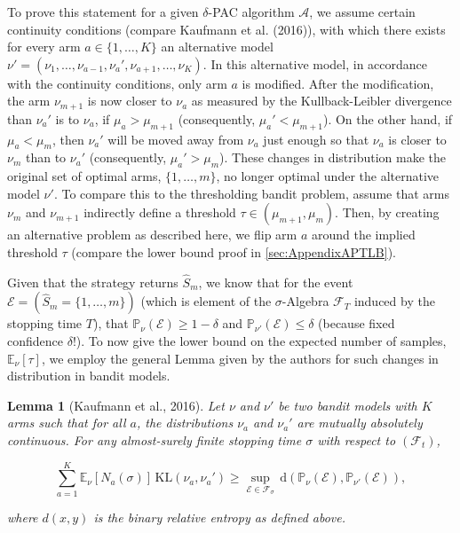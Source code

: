 \documentclass[11pt,]{article}
\newtheorem{lemma}{Lemma}
\newcommand{\KL}{\,\text{KL}}
\newcommand{\der}{\,\text{d}}
\begin{document}
To prove this statement for a given \(\delta\)-PAC algorithm
\(\mathcal{A}\), we assume certain continuity conditions (compare
Kaufmann et al. (2016)), with which there exists for every arm
\(a \in \{1, \dots, K\}\) an alternative model
\(\nu' = (\nu_1, \dots, \nu_{a-1}, \nu_a', \nu_{a+1}, \dots, \nu_K)\).
In this alternative model, in accordance with the continuity conditions,
only arm \(a\) is modified. After the modification, the arm
\(\nu_{m+1}\) is now closer to \(\nu_a\) as measured by the
Kullback-Leibler divergence than \(\nu_a'\) is to \(\nu_a\), if
\(\mu_a > \mu_{m+1}\) (consequently, \(\mu_a' < \mu_{m+1}\)). On the
other hand, if \(\mu_a < \mu_{m}\), then \(\nu_a'\) will be moved away
from \(\nu_a\) just enough so that \(\nu_a\) is closer to \(\nu_m\) than
to \(\nu_a'\) (consequently, \(\mu_a' > \mu_m\)). These changes in
distribution make the original set of optimal arms, \(\{1,\dots,m\}\),
no longer optimal under the alternative model \(\nu'\). To compare this
to the thresholding bandit problem, assume that arms \(\nu_{m}\) and
\(\nu_{m+1}\) indirectly define a threshold
\(\tau \in (\mu_{m+1},\mu_m)\). Then, by creating an alternative problem
as described here, we flip arm \(a\) around the implied threshold
\(\tau\) (compare the lower bound proof in \autoref{sec:AppendixAPTLB}).

Given that the strategy returns \(\hat{S}_m\), we know that for the
event \(\mathcal{E} = (\hat{S}_m = \{1, \dots, m\})\) (which is element
of the \(\sigma\)-Algebra \(\mathcal{F}_{T}\) induced by the stopping
time \(T\)), that \(\mathbb{P}_{\nu}(\mathcal{E}) \geq 1-\delta\) and
\(\mathbb{P}_{\nu'}(\mathcal{E}) \leq \delta\) (because fixed confidence
\(\delta\)!). To now give the lower bound on the expected number of
samples, \(\mathbb{E}_{\nu}[\tau]\), we employ the general Lemma given
by the authors for such changes in distribution in bandit models.

\begin{lemma}[Kaufmann et al., 2016] \label{theorem:KaufmannEtAlLemma1}
Let $\nu$ and $\nu'$ be two bandit models with $K$ arms such that for all $a$, the distributions $\nu_a$ and $\nu_a'$ are mutually absolutely continuous. For any almost-surely finite stopping time $\sigma$ with respect to $(\mathcal{F}_t)$,

\begin{equation*}
\sum_{a=1}^{K} \mathbb{E}_{\nu} [N_a(\sigma)] \KL(\nu_a, \nu_a') \geq \sup_{\mathcal{E} \in \mathcal{F}_{\sigma}} \der (\mathbb{P}_{\nu}(\mathcal{E}), \mathbb{P}_{\nu'}(\mathcal{E})),
\end{equation*}

where $d(x,y)$ is the binary relative entropy as defined above.
\end{lemma}
\end{document}
